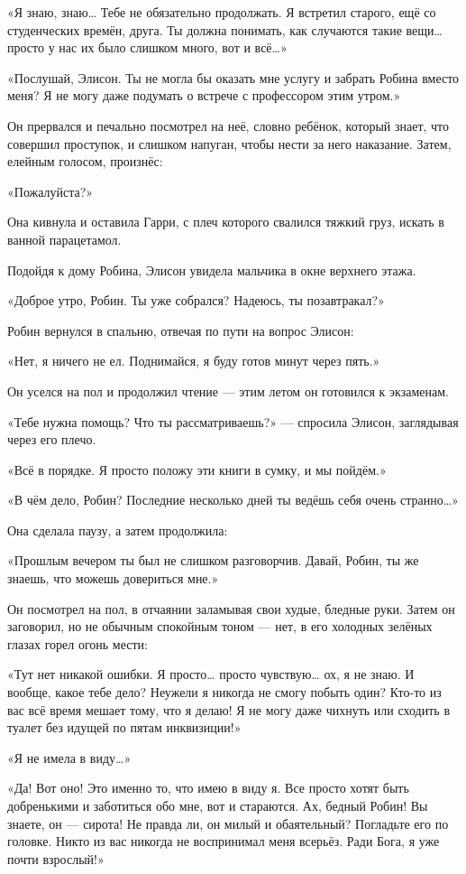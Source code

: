 \documentclass[a5paper, 9pt,
final, openany, twoside=true]{memoir}
\begin{document}
«Я знаю, знаю… Тебе не обязательно продолжать. Я встретил старого, ещё со студенческих времён, друга. Ты должна понимать, как случаются такие вещи… просто у нас их было слишком много, вот и всё…»

«Послушай, Элисон. Ты не могла бы оказать мне услугу и забрать Робина вместо меня? Я не могу даже подумать о встрече с профессором этим утром.»

Он прервался и печально посмотрел на неё, словно ребёнок, который знает, что совершил проступок, и слишком напуган, чтобы нести за него наказание. Затем, елейным голосом, произнёс:

«Пожалуйста?»

Она кивнула и оставила Гарри, с плеч которого свалился тяжкий груз, искать в ванной парацетамол.\bigskip

Подойдя к дому Робина, Элисон увидела мальчика в окне верхнего этажа.

«Доброе утро, Робин. Ты уже собрался? Надеюсь, ты позавтракал?»

Робин вернулся в спальню, отвечая по пути на вопрос Элисон:

«Нет, я ничего не ел. Поднимайся, я буду готов минут через пять.»

Он уселся на пол и продолжил чтение — этим летом он готовился к экзаменам.

«Тебе нужна помощь? Что ты рассматриваешь?» — спросила Элисон, заглядывая через его плечо.

«Всё в порядке. Я просто положу эти книги в сумку, и мы пойдём.»

«В чём дело, Робин? Последние несколько дней ты ведёшь себя очень странно…»

Она сделала паузу, а затем продолжила:

«Прошлым вечером ты был не слишком разговорчив. Давай, Робин, ты же знаешь, что можешь довериться мне.»

Он посмотрел на пол, в отчаянии заламывая свои худые, бледные руки. Затем он заговорил, но не обычным спокойным тоном — нет, в его холодных зелёных глазах горел огонь мести:

«Тут нет никакой ошибки. Я просто… просто чувствую… ох, я не знаю. И вообще, какое тебе дело? Неужели я никогда не смогу побыть один? Кто-то из вас всё время мешает тому, что я делаю! Я не могу даже чихнуть или сходить в туалет без идущей по пятам инквизиции!»

«Я не имела в виду…»

«Да! Вот оно! Это именно то, что имею в виду я. Все просто хотят быть добренькими и заботиться обо мне, вот и стараются. Ах, бедный Робин! Вы знаете, он — сирота! Не правда ли, он милый и обаятельный? Погладьте его по головке. Никто из вас никогда не воспринимал меня всерьёз. Ради Бога, я уже почти взрослый!»
\end{document}
